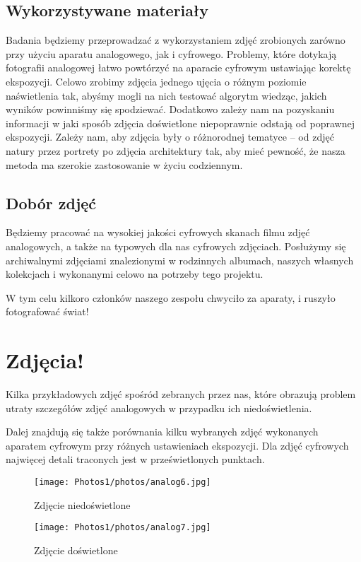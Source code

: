 \documentclass[]{mwart}
\begin{document}
\subsection{Wykorzystywane materiały}
Badania będziemy przeprowadzać z wykorzystaniem zdjęć zrobionych
zarówno przy użyciu aparatu analogowego, jak i cyfrowego. Problemy,
które dotykają fotografii analogowej łatwo powtórzyć na aparacie cyfrowym
ustawiając korektę ekspozycji.
Celowo zrobimy zdjęcia jednego ujęcia o różnym poziomie naświetlenia tak,
abyśmy mogli na nich testować algorytm wiedząc, jakich wyników powinniśmy
się spodziewać. Dodatkowo zależy nam na pozyskaniu informacji w jaki sposób zdjęcia doświetlone niepoprawnie odstają od poprawnej ekspozycji.
Zależy nam, aby zdjęcia były o różnorodnej tematyce -- od zdjęć
natury przez portrety po zdjęcia architektury tak, aby mieć pewność, że nasza
metoda ma szerokie zastosowanie w życiu codziennym.


\subsection{Dobór zdjęć}
Będziemy pracować na wysokiej jakości cyfrowych skanach filmu zdjęć
analogowych, a także na typowych dla nas cyfrowych zdjęciach.
Posłużymy się archiwalnymi zdjęciami znalezionymi w
rodzinnych albumach, naszych własnych kolekcjach i wykonanymi
celowo na potrzeby tego projektu.

W tym celu kilkoro członków naszego zespołu chwyciło
za aparaty, i ruszyło fotografować świat!

\newpage
\section{Zdjęcia!}
Kilka przykładowych zdjęć spośród zebranych przez nas, które obrazują problem
utraty szczegółów zdjęć analogowych w przypadku ich niedoświetlenia. \newline

Dalej znajdują się także porównania kilku wybranych zdjęć wykonanych
aparatem cyfrowym przy różnych ustawieniach ekspozycji. Dla zdjęć
cyfrowych najwięcej detali traconych jest w prześwietlonych punktach.











\begin{figure}[H]
    \centering
    \texttt{[image: Photos1/photos/analog6.jpg]}
    \caption{Zdjęcie niedoświetlone}
\end{figure}
\begin{figure}[H]
    \centering
    \texttt{[image: Photos1/photos/analog7.jpg]}
    \caption{Zdjęcie doświetlone}
\end{figure}
\end{document}
